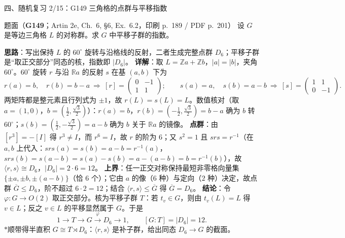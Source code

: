 \documentclass[aspectratio=169,10pt,fontset=none]{ctexbeamer}
\newcommand{\ex}[1]{\textcolor{accent}{\footnotesize\bfseries #1}}
\newcommand{\key}[1]{\textcolor{ink}{\bfseries #1}}
\newcommand{\starpt}{\textcolor{accent}{\bfseries$\ast$}}
\begin{document}
\begin{frame}[t]{四、随机复习 2/15：G149 三角格的点群与平移指数}
\label{ex:G149}
\scriptsize
\begin{block}{\footnotesize 题面（\ex{G149}；Artin 2e, Ch.~6, §6, Ex.~6.2，印刷 p.~189 / PDF p.~201）}
设 $G$ 是等边三角格 $L$ 的对称群。求 $G$ 中平移子群的指数。
\end{block}
\key{思路}：写出保持 $L$ 的 $60^\circ$ 旋转与沿格线的反射，二者生成完整点群 $D_6$；平移子群是“取正交部分”同态的核，指数即 $|D_6|$。
\key{详解}：取 $L=\mathbb Za+\mathbb Zb$，$|a|=|b|$，夹角 $60^\circ$。$60^\circ$ 旋转 $r$ 与沿 $\mathbb Ra$ 的反射 $s$ 在基 $(a,b)$ 下为
\[ r(a)=b,\quad r(b)=b-a\ \Longrightarrow\ [r]=\begin{pmatrix}0&-1\\1&1\end{pmatrix};\qquad s(a)=a,\quad s(b)=a-b\ \Longrightarrow\ [s]=\begin{pmatrix}1&1\\0&-1\end{pmatrix}. \]
两矩阵都是整元素且行列式为 $\pm1$，故 $r(L)=s(L)=L$。数值核对（取 $a=(1,0)$，$b=(\tfrac12,\tfrac{\sqrt3}2)$）：$r(a)=b$，$r(b)=(-\tfrac12,\tfrac{\sqrt3}2)=b-a$ 确为 $b$ 转 $60^\circ$；$s(b)=(\tfrac12,-\tfrac{\sqrt3}2)=a-b$ 确为 $b$ 关于 $\mathbb Ra$ 的镜像。
\key{点群}：由 $[r^3]=-[I]$ 得 $r^3\ne I$，而 $r^6=I$，故 $r$ 的阶为 $6$；又 $s^2=1$ 且 $srs=r^{-1}$（在 $a,b$ 上代入：$srs(a)=s(b)=a-b=r^{-1}(a)$，$srs(b)=s(a-b)=s(a)-s(b)=a-(a-b)=b=r^{-1}(b)$），故 $\langle r,s\rangle\cong D_6$，$|D_6|=2\cdot6=12$。
\key{上界}：任一正交对称保持最短非零格向量集 $\{\pm a,\pm b,\pm(a-b)\}$（恰 $6$ 个）；它由 $a$ 的像（$6$ 种）与定向（$2$ 种）决定，故点群 $\overline G\le D_6$，阶不超过 $6\cdot2=12$；结合 $\langle r,s\rangle\le\overline G$ 得 $\overline G=D_6$。
\key{结论}：令 $\varphi:G\to O(2)$ 取正交部分。核为平移子群 $T$：若 $t_v\in G$，则由 $t_v(L)=L$ 得 $v\in L$；反之 $v\in L$ 的平移显然属于 $G$。于是
\[ 1\longrightarrow T\longrightarrow G\overset{\varphi}{\longrightarrow}D_6\longrightarrow 1,\qquad [G:T]=|D_6|=12. \]
\starpt{}顺带得半直积 $G\cong T\rtimes D_6$：$\langle r,s\rangle$ 是补子群，给出同态 $D_6\to G$ 的截面。
\end{frame}
\end{document}
